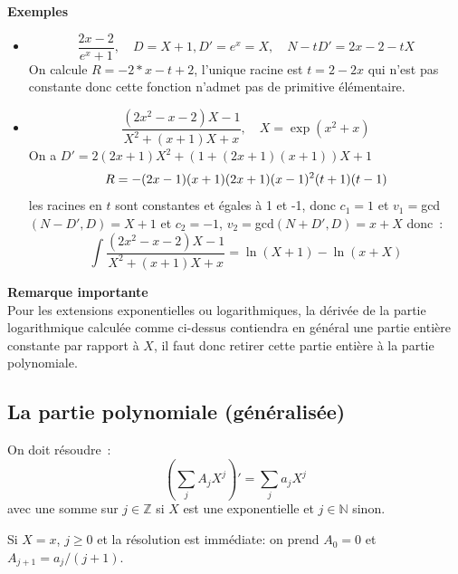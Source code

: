 \documentclass[a4paper,11pt]{book}
\begin{document}
\begin{giacjshere}
{\bf Exemples}
\begin{itemize}
\item
\[ \frac{2x-2}{e^x+1}, \quad D=X+1, D'=e^x=X, \quad N-tD'=2x-2-tX \]
On calcule $R=-2*x-t+2$, l'unique racine est $t=2-2x$ qui n'est
pas constante donc cette fonction n'admet pas de primitive élémentaire.
\item 
\[ \frac{(2x^2-x-2)X-1}{X^2+(x+1)X+x}, \quad X=\exp(x^2+x)\]
On a $D'=2(2x+1)X^2+(1+(2x+1)(x+1))X+1$
\[ R=-(2\*x-1)\*(x+1)\*(2\*x+1)\*(x-1)^2\*(t+1)\*(t-1) \]
les racines en $t$ sont constantes et égales à 1 et -1, donc $c_1=1$
et $v_1=$gcd$(N-D',D)=X+1$ et $c_2=-1$, $v_2=$gcd$(N+D',D)=x+X$
donc~:
\[ \int \frac{(2x^2-x-2)X-1}{X^2+(x+1)X+x} = \ln(X+1)-\ln(x+X)\]
\end{itemize}

{\bf Remarque importante}\\
Pour les extensions exponentielles ou logarithmiques, 
la d\'eriv\'ee de la partie logarithmique
calcul\'ee comme ci-dessus contiendra en g\'en\'eral 
une partie enti\`ere constante par rapport \`a $X$, il faut
donc retirer cette partie enti\`ere \`a la partie polynomiale.

\subsection{La partie polynomiale (généralisée)}
On doit résoudre~:
\[ (\sum_j A_j X^j)'=\sum_j a_j X^j \]
avec une somme sur $j \in\mathbb{Z}$ si $X$ est une exponentielle et
$j\in \mathbb{N}$ sinon.

Si $X=x$, $j\geq 0$ et la résolution est immédiate: on prend $A_0=0$ et 
$A_{j+1}=a_{j}/(j+1)$.


\end{giacjshere}
\end{document}

